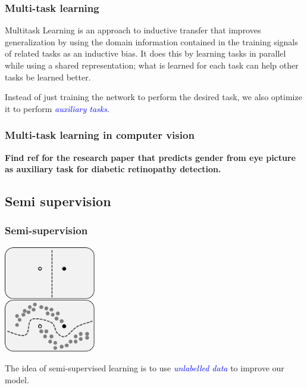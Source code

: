 \documentclass[10pt]{beamer}
\begin{document}
\begin{frame}
  \frametitle{Multi-task learning}

  \begin{displayquote}
    Multitask Learning is an approach to inductive transfer that
    improves generalization by using the domain information contained
    in the training signals of related tasks as an inductive bias. It
    does this by learning tasks in parallel while using a shared
    representation; what is learned for each task can help other tasks
    be learned better.
  \end{displayquote}

  \bigskip

  Instead of just training the network to perform the desired task, we
  also optimize it to perform \textcolor{blue}{\emph{auxiliary
      tasks}}.
\end{frame}

\begin{frame}
  \frametitle{Multi-task learning in computer vision}

  \textbf{Find ref for the research paper that predicts gender from
    eye picture as auxiliary task for diabetic retinopathy detection.}
\end{frame}

\subsection{Semi supervision}

\begin{frame}

  \frametitle{Semi-supervision}

  \begin{center}
    \includegraphics[width=4cm]{images/semi_supervised_learning.png}
  \end{center}

  \bigskip

  The idea of semi-supervised learning is to use
  \textcolor{blue}{\emph{unlabelled data}} to improve our model.
\end{frame}
\end{document}
